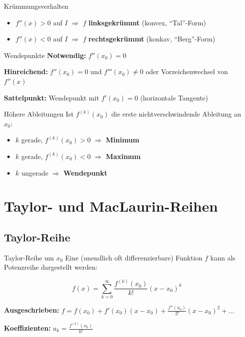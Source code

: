 \documentclass[a4paper,fontsize = 7pt]{scrartcl}
\begin{document}
\begin{mainbox}{Krümmungsverhalten}
	\begin{itemize}
		\item $f''(x) > 0$ auf $I$ $\Rightarrow$ $f$ \textbf{linksgekrümmt} (konvex, ``Tal''-Form)
		\item $f''(x) < 0$ auf $I$ $\Rightarrow$ $f$ \textbf{rechtsgekrümmt} (konkav, ``Berg''-Form)
	\end{itemize}
\end{mainbox}

\begin{subbox}{Wendepunkte}
	\textbf{Notwendig:} $f''(x_0) = 0$

	\textbf{Hinreichend:} $f''(x_0) = 0$ und $f'''(x_0) \neq 0$ oder Vorzeichenwechsel von $f''(x)$

	\textbf{Sattelpunkt:} Wendepunkt mit $f'(x_0) = 0$ (horizontale Tangente)
\end{subbox}

\begin{mainbox}{Höhere Ableitungen}
	Ist $f^{(k)}(x_0)$ die erste nichtverschwindende Ableitung an $x_0$:
	\begin{itemize}
		\item $k$ gerade, $f^{(k)}(x_0) > 0$ $\Rightarrow$ \textbf{Minimum}
		\item $k$ gerade, $f^{(k)}(x_0) < 0$ $\Rightarrow$ \textbf{Maximum}
		\item $k$ ungerade $\Rightarrow$ \textbf{Wendepunkt}
	\end{itemize}
\end{mainbox}

\section{Taylor- und MacLaurin-Reihen}

\subsection{Taylor-Reihe}

\begin{mainbox}{Taylor-Reihe um $x_0$}
Eine (unendlich oft differenzierbare) Funktion $f$ kann als Potenzreihe dargestellt werden:

$$\boxed{f(x) = \sum_{k=0}^{\infty} \frac{f^{(k)}(x_0)}{k!} (x - x_0)^k}$$

\textbf{Ausgeschrieben:} $f = f(x_0) + f'(x_0)(x-x_0) + \frac{f''(x_0)}{2!}(x-x_0)^2 + \ldots$

\textbf{Koeffizienten:} $a_k = \frac{f^{(k)}(x_0)}{k!}$
\end{mainbox}
\end{document}
